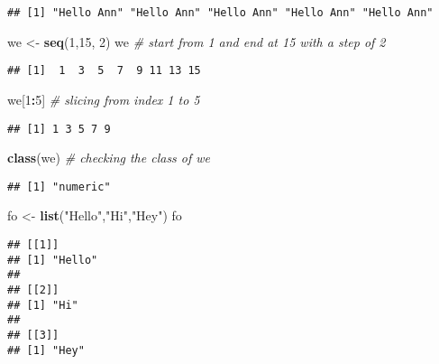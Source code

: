 \documentclass[
]{article}
\newenvironment{Shaded}{\begin{snugshade}}{\end{snugshade}}
\newcommand{\CommentTok}[1]{\textcolor[rgb]{0.56,0.35,0.01}{\textit{#1}}}
\newcommand{\DecValTok}[1]{\textcolor[rgb]{0.00,0.00,0.81}{#1}}
\newcommand{\FunctionTok}[1]{\textcolor[rgb]{0.13,0.29,0.53}{\textbf{#1}}}
\newcommand{\NormalTok}[1]{#1}
\newcommand{\OtherTok}[1]{\textcolor[rgb]{0.56,0.35,0.01}{#1}}
\newcommand{\SpecialCharTok}[1]{\textcolor[rgb]{0.81,0.36,0.00}{\textbf{#1}}}
\newcommand{\StringTok}[1]{\textcolor[rgb]{0.31,0.60,0.02}{#1}}
\begin{document}
\begin{verbatim}
## [1] "Hello Ann" "Hello Ann" "Hello Ann" "Hello Ann" "Hello Ann"
\end{verbatim}

\begin{Shaded}
\begin{Highlighting}[]
\NormalTok{we }\OtherTok{\textless{}{-}} \FunctionTok{seq}\NormalTok{(}\DecValTok{1}\NormalTok{,}\DecValTok{15}\NormalTok{, }\DecValTok{2}\NormalTok{) }
\NormalTok{we  }\CommentTok{\# start from 1 and end at 15 with a step of 2}
\end{Highlighting}
\end{Shaded}

\begin{verbatim}
## [1]  1  3  5  7  9 11 13 15
\end{verbatim}

\begin{Shaded}
\begin{Highlighting}[]
\NormalTok{we[}\DecValTok{1}\SpecialCharTok{:}\DecValTok{5}\NormalTok{] }\CommentTok{\# slicing from index 1 to 5}
\end{Highlighting}
\end{Shaded}

\begin{verbatim}
## [1] 1 3 5 7 9
\end{verbatim}

\begin{Shaded}
\begin{Highlighting}[]
\FunctionTok{class}\NormalTok{(we) }\CommentTok{\# checking the class of we}
\end{Highlighting}
\end{Shaded}

\begin{verbatim}
## [1] "numeric"
\end{verbatim}

\begin{Shaded}
\begin{Highlighting}[]
\NormalTok{fo }\OtherTok{\textless{}{-}} \FunctionTok{list}\NormalTok{(}\StringTok{"Hello"}\NormalTok{,}\StringTok{"Hi"}\NormalTok{,}\StringTok{"Hey"}\NormalTok{)}
\NormalTok{fo}
\end{Highlighting}
\end{Shaded}

\begin{verbatim}
## [[1]]
## [1] "Hello"
## 
## [[2]]
## [1] "Hi"
## 
## [[3]]
## [1] "Hey"
\end{verbatim}
\end{document}
